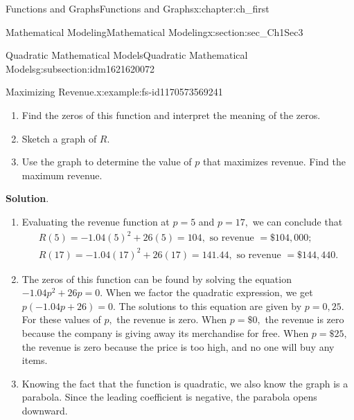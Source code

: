\documentclass[oneside,10pt,]{book}
\newcommand{\blocktitlefont}{\relax}
\numberwithin{equation}{section}
\begin{document}
\begin{chapterptx}{Functions and Graphs}{}{Functions and Graphs}{}{}{x:chapter:ch_first}
\begin{sectionptx}{Mathematical Modeling}{}{Mathematical Modeling}{}{}{x:section:sec_Ch1Sec3}
\begin{subsectionptx}{Quadratic Mathematical Models}{}{Quadratic Mathematical Models}{}{}{g:subsection:idm1621620072}
\begin{example}{Maximizing Revenue.}{x:example:fs-id1170573569241}
\begin{enumerate}
\item{}Find the zeros of this function and interpret the meaning of the zeros.%
\item{}Sketch a graph of \(R.\)%
\item{}Use the graph to determine the value of \(p\) that maximizes revenue. Find the maximum revenue.%
\end{enumerate}
\par\smallskip%
\noindent\textbf{\blocktitlefont Solution}.\hypertarget{g:solution:idm1621571176}{}\quad{}%
\begin{enumerate}
\item{}Evaluating the revenue function at \(p= 5 \) and \(p= 17 ,\) we can conclude that%
\begin{gather*}
R( 5 )= -1.04 ( 5 )^2+ 26 ( 5 )= 104 , \text{ so revenue } = \$104,000; \\
R( 17 )= -1.04( 17 )^2+ 26 ( 17 )= 141.44 , \text{ so revenue } =\$144,440.
\end{gather*}
%
\item{}The zeros of this function can be found by solving the equation \(-1.04p^2+ 26 p= 0 .\) When we factor the quadratic expression, we get \(p( -1.04 p+ 26 )= 0 .\) The solutions to this equation are given by \(p= 0 , 25 .\) For these values of \(p,\) the revenue is zero. When \(p=\$ 0 ,\) the revenue is zero because the company is giving away its merchandise for free. When \(p=\$ 25 ,\) the revenue is zero because the price is too high, and no one will buy any items.%
\item{}Knowing the fact that the function is quadratic, we also know the graph is a parabola. Since the leading coefficient is negative, the parabola opens downward. \begin{image}{0.25}{0.5}{0.25}%

\end{image}
\end{enumerate}
\end{example}
\end{subsectionptx}
\end{sectionptx}
\end{chapterptx}
\end{document}
